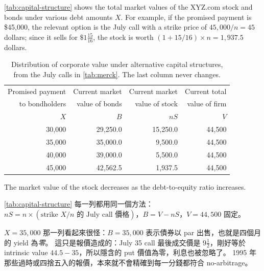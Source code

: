 
\autoref{tab:capital-structure} shows the total market values of the XYZ.com stock and bonds under various debt amounts $X$.
For example, if the promised payment is \$45,000, the relevant option is the July call with a strike price of $45{,}000/n=45$ dollars; since it sells for $\$1\frac{15}{16}$, the stock is worth $(1+15/16)\times n=1{,}937.5$ dollars.

\begin{table}[H]
	\centering
	\begin{tabular}{rrrr}
		\toprule
		Promised payment & Current market & Current market & Current total \\
		to bondholders   & value of bonds & value of stock & value of firm \\
		$X$              & $B$            & $nS$           & $V$           \\
		\midrule
		30{,}000         & 29{,}250.0     & 15{,}250.0     & 44{,}500      \\
		35{,}000         & 35{,}000.0     & 9{,}500.0      & 44{,}500      \\
		40{,}000         & 39{,}000.0     & 5{,}500.0      & 44{,}500      \\
		45{,}000         & 42{,}562.5     & 1{,}937.5      & 44{,}500      \\
		\bottomrule
	\end{tabular}
	\caption{Distribution of corporate value under alternative capital
		structures, from the July calls in \autoref{tab:merck}. The last column
		never changes.}
	\label{tab:capital-structure}
\end{table}

The market value of the stock decreases as the debt-to-equity ratio increases.

\suppstart
{}

\begin{remark}
	\autoref{tab:capital-structure} 每一列都用同一個方法：$nS=n\times(\text{strike }X/n\text{ 的 July call 價格})$，$B=V-nS$，$V=44{,}500$ 固定。
\end{remark}

\begin{note}
	$X=35{,}000$ 那一列看起來很怪：$B=35{,}000$ 表示債券以 par 出售，也就是四個月的 yield 為\emph{零}。
	這只是報價造成的：July 35 call 最後成交價是 $9\frac12$，剛好等於 intrinsic value $44.5-35$，所以隱含的 put 價值為零，利息也被忽略了。
	1995 年那些過時或四捨五入的報價，本來就不會精確到每一分錢都符合 no-arbitrage。
\end{note}
\suppend

